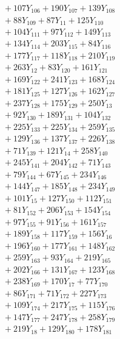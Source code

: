 \documentclass[a4paper,10pt]{article}
\begin{document}
{\begin{align}
&\quad  + 107Y_{106} + 190Y_{107} + 139Y_{108} \\[0.5ex]
&\quad  + 88Y_{109} + 87Y_{11} + 125Y_{110} \\[0.5ex]
&\quad  + 104Y_{111} + 97Y_{112} + 149Y_{113} \\[0.5ex]
&\quad  + 134Y_{114} + 203Y_{115} + 84Y_{116} \\[0.5ex]
&\quad  + 177Y_{117} + 118Y_{118} + 210Y_{119} \\[0.5ex]
&\quad  + 263Y_{12} + 83Y_{120} + 161Y_{121} \\[0.5ex]
&\quad  + 169Y_{122} + 241Y_{123} + 168Y_{124} \\[0.5ex]
&\quad  + 181Y_{125} + 127Y_{126} + 162Y_{127} \\[0.5ex]
&\quad  + 237Y_{128} + 175Y_{129} + 250Y_{13} \\[0.5ex]
&\quad  + 92Y_{130} + 189Y_{131} + 104Y_{132} \\[0.5ex]
&\quad  + 225Y_{133} + 225Y_{134} + 259Y_{135} \\[0.5ex]
&\quad  + 129Y_{136} + 137Y_{137} + 226Y_{138} \\[0.5ex]
&\quad  + 71Y_{139} + 121Y_{14} + 258Y_{140} \\[0.5ex]
&\quad  + 245Y_{141} + 204Y_{142} + 71Y_{143} \\[0.5ex]
&\quad  + 79Y_{144} + 67Y_{145} + 234Y_{146} \\[0.5ex]
&\quad  + 144Y_{147} + 185Y_{148} + 234Y_{149} \\[0.5ex]
&\quad  + 101Y_{15} + 127Y_{150} + 112Y_{151} \\[0.5ex]
&\quad  + 81Y_{152} + 206Y_{153} + 154Y_{154} \\[0.5ex]
&\quad  + 97Y_{155} + 91Y_{156} + 161Y_{157} \\[0.5ex]
&\quad  + 189Y_{158} + 117Y_{159} + 156Y_{16} \\[0.5ex]
&\quad  + 196Y_{160} + 177Y_{161} + 148Y_{162} \\[0.5ex]
&\quad  + 259Y_{163} + 93Y_{164} + 219Y_{165} \\[0.5ex]
&\quad  + 202Y_{166} + 131Y_{167} + 123Y_{168} \\[0.5ex]
&\quad  + 238Y_{169} + 170Y_{17} + 77Y_{170} \\[0.5ex]
&\quad  + 86Y_{171} + 71Y_{172} + 227Y_{173} \\[0.5ex]
&\quad  + 109Y_{174} + 217Y_{175} + 115Y_{176} \\[0.5ex]
&\quad  + 147Y_{177} + 247Y_{178} + 258Y_{179} \\[0.5ex]
&\quad  + 219Y_{18} + 129Y_{180} + 178Y_{181} \\[0.5ex]

\end{align}}
\end{document}
